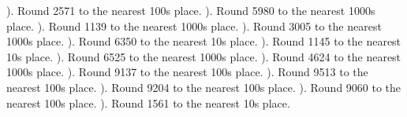 \documentclass{article}%
\begin{document}
\newline%
). Round 2571 to the nearest 100s place.%
\newline%
\newline%
). Round 5980 to the nearest 1000s place.%
\newline%
\newline%
). Round 1139 to the nearest 1000s place.%
\newline%
\newline%
). Round 3005 to the nearest 1000s place.%
\newline%
\newline%
). Round 6350 to the nearest 10s place.%
\newline%
\newline%
). Round 1145 to the nearest 10s place.%
\newline%
\newline%
). Round 6525 to the nearest 1000s place.%
\newline%
\newline%
). Round 4624 to the nearest 1000s place.%
\newline%
\newline%
). Round 9137 to the nearest 100s place.%
\newline%
\newline%
). Round 9513 to the nearest 100s place.%
\newline%
\newline%
). Round 9204 to the nearest 100s place.%
\newline%
\newline%
). Round 9060 to the nearest 100s place.%
\newline%
\newline%
). Round 1561 to the nearest 10s place.%
\newline%
\newline%
\newline%
\end{document}
